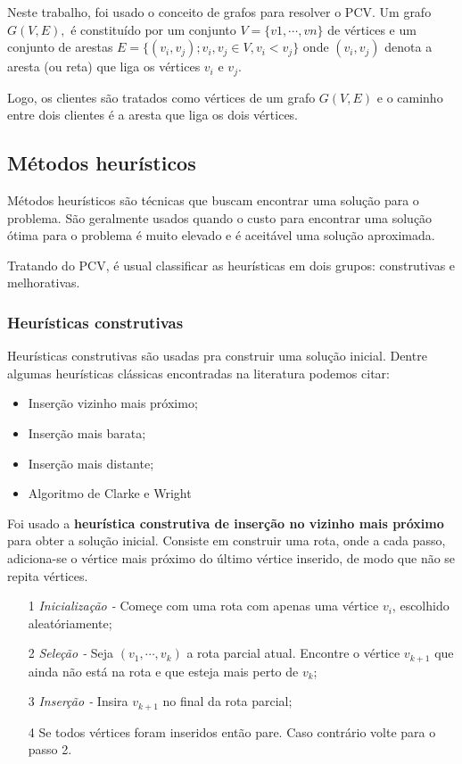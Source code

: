 \documentclass[12pt]{article}
\begin{document}
Neste trabalho, foi usado o conceito de grafos para resolver o PCV.
Um grafo $ G(V,E), $ é constituído por um conjunto $V = \{v{1},\cdots, v{n}\}$
de vértices e um conjunto de arestas $ E = \{ (v_{i}, v_{j}); v_{i}, v_{j} \in V,v_{i} < v_{j}  \}  $
onde $(v_{i}, v_{j})$
denota a aresta (ou reta) que liga os vértices $v_{i}$ e $v_{j}$.

Logo, os clientes são tratados como vértices de um grafo $ G(V,E)$
e o caminho entre dois clientes é a aresta que liga os dois vértices.


\subsection{Métodos heurísticos}
Métodos heurísticos são técnicas que buscam encontrar
uma solução para o problema. São geralmente usados quando o custo
para encontrar uma solução ótima para o problema é muito elevado e
é aceitável uma solução aproximada.

Tratando do PCV, é usual classificar as heurísticas em dois grupos: construtivas e melhorativas.

\subsubsection{Heurísticas construtivas}
Heurísticas construtivas são usadas pra construir uma solução inicial.
Dentre algumas heurísticas clássicas encontradas na literatura podemos citar:
\begin{itemize}
	\item Inserção vizinho mais próximo;
	\item Inserção mais barata;
	\item Inserção mais distante;
	\item Algoritmo de Clarke e Wright
\end{itemize}

Foi usado a \textbf{heurística construtiva de inserção no vizinho mais próximo} para obter a solução inicial.
Consiste em construir uma rota, onde a cada passo, adiciona-se o vértice mais próximo do último vértice inserido, de modo que não se repita vértices.

\begin{itemize}
	\item[1] \textit{Inicialização - }Começe com uma rota com apenas uma vértice $v_{i}$, escolhido aleatóriamente;
	\item[2] \textit{Seleção - } Seja $ (v_{1},\cdots,v_{k}) $ a rota parcial atual. Encontre o vértice $ v_{k+1} $ que ainda não está na rota e que esteja mais perto de 
	$ v_{k} $;
	\item[3] \textit{Inserção - }Insira $ v_{k+1} $ no final da rota parcial;
	\item[4] Se todos vértices foram inseridos então pare. Caso contrário volte para o passo 2.
\end{itemize}
\end{document}
